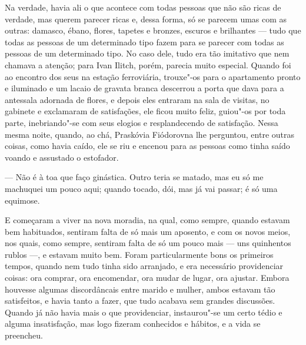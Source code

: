Na verdade, havia ali o que acontece com todas pessoas que não são ricas
de verdade, mas querem parecer ricas e, dessa forma, só se parecem umas
com as outras: damasco, ébano, flores, tapetes e bronzes, escuros e
brilhantes --- tudo que todas as pessoas de um determinado tipo fazem
para se parecer com todas as pessoas de um determinado tipo. No caso
dele, tudo era tão imitativo que nem chamava a atenção; para Ivan
Ilitch, porém, parecia muito especial. Quando foi ao encontro dos seus
na estação ferroviária, trouxe"-os para o apartamento pronto e iluminado
e um lacaio de gravata branca descerrou a porta que dava para a
antessala adornada de flores, e depois eles entraram na sala de visitas,
no gabinete e exclamaram de satisfações, ele ficou muito feliz, guiou"-os
por toda parte, inebriando"-se com seus elogios e resplandecendo de
satisfação. Nessa mesma noite, quando, ao chá, Praskóvia Fiódorovna lhe
perguntou, entre outras coisas, como havia caído, ele se riu e encenou
para as pessoas como tinha saído voando e assustado o estofador.

--- Não é à toa que faço ginástica. Outro teria se matado, mas eu só me
machuquei um pouco aqui; quando tocado, dói, mas já vai passar; é só uma
equimose.

E começaram a viver na nova moradia, na qual, como sempre, quando
estavam bem habituados, sentiram falta de só mais um aposento, e com os
novos meios, nos quais, como sempre, sentiram falta de só um pouco mais
--- uns quinhentos rublos ---, e estavam muito bem. Foram particularmente
bons os primeiros tempos, quando nem tudo tinha sido arranjado, e era
necessário providenciar coisas: ora comprar, ora encomendar, ora mudar
de lugar, ora ajustar. Embora houvesse algumas discordâncais entre
marido e mulher, ambos estavam tão satisfeitos, e havia tanto a fazer,
que tudo acabava sem grandes discussões. Quando já não havia mais o que
providenciar, instaurou"-se um certo tédio e alguma insatisfação, mas
logo fizeram conhecidos e hábitos, e a vida se preencheu.

